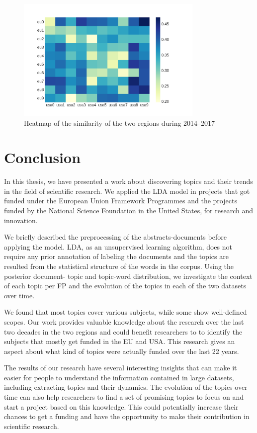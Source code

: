 \documentclass[12pt]{report}
\begin{document}
\begin{figure}[H]
\centering
\includegraphics[width=0.8\textwidth]
{figs/heatmaps/heatmapH2020.png}
\caption{Heatmap of the similarity of the two regions during 2014--2017}
\label{heatmap20}
\end{figure}
\vfill

\section{Conclusion}
\label{conclusion}
In this thesis, we have presented a work about discovering topics and their
trends in the field of scientific research. We applied the LDA model in projects
that got funded under the European Union Framework Programmes and the projects
funded by the National Science Foundation in the United States, for research and
innovation.

We briefly described the preprocessing of the
abstracts-documents before applying the model. LDA, as an unsupervised
learning algorithm, does not require any prior annotation of labeling
the documents and the topics are resulted from the statistical
structure of the words in the corpus. Using the posterior document-
topic and topic-word distribution, we investigate the context of each
topic per FP and the evolution of the topics in each of the two
datasets over time.

We found that most topics cover various subjects, while some show 
well-defined scopes. Our work provides
valuable knowledge about the research over the last two decades in the
two regions and could benefit researchers to to identify the subjects
that mostly get funded in the EU and USA. This research gives an aspect 
about what kind of topics were actually funded over
the last 22 years.

The results of our research have several interesting insights that can make it
easier for people to understand the information contained in large datasets,
including extracting topics and their dynamics. The evolution of the topics over
time can also help researchers to find a set of promising topics to focus on and
start a project based on this knowledge. This could potentially increase their
chances to get a funding and have the opportunity to make their contribution in
scientific research.
\end{document}

